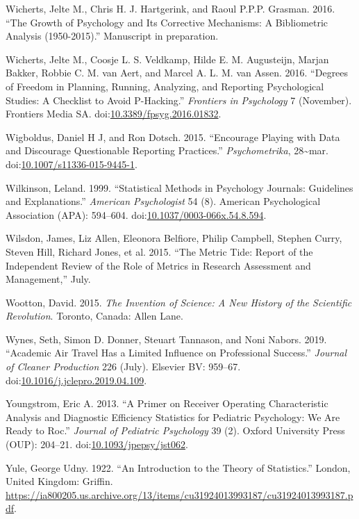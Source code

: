 \documentclass[a5paper]{book}
\begin{document}
\hypertarget{ref-wicherts2016}{}
Wicherts, Jelte M., Chris H. J. Hartgerink, and Raoul P.P.P. Grasman.
2016. ``The Growth of Psychology and Its Corrective Mechanisms: A
Bibliometric Analysis (1950-2015).'' Manuscript in preparation.

\hypertarget{ref-doi:10.3389ux2ffpsyg.2016.01832}{}
Wicherts, Jelte M., Coosje L. S. Veldkamp, Hilde E. M. Augusteijn,
Marjan Bakker, Robbie C. M. van Aert, and Marcel A. L. M. van Assen.
2016. ``Degrees of Freedom in Planning, Running, Analyzing, and
Reporting Psychological Studies: A Checklist to Avoid P-Hacking.''
\emph{Frontiers in Psychology} 7 (November). Frontiers Media SA.
doi:\href{https://doi.org/10.3389/fpsyg.2016.01832}{10.3389/fpsyg.2016.01832}.

\hypertarget{ref-doi:10.1007ux2fs11336-015-9445-1}{}
Wigboldus, Daniel H J, and Ron Dotsch. 2015. ``Encourage Playing with
Data and Discourage Questionable Reporting Practices.''
\emph{Psychometrika}, 28\textasciitilde{}mar.
doi:\href{https://doi.org/10.1007/s11336-015-9445-1}{10.1007/s11336-015-9445-1}.

\hypertarget{ref-doi:10.1037ux2f0003-066x.54.8.594}{}
Wilkinson, Leland. 1999. ``Statistical Methods in Psychology Journals:
Guidelines and Explanations.'' \emph{American Psychologist} 54 (8).
American Psychological Association (APA): 594--604.
doi:\href{https://doi.org/10.1037/0003-066x.54.8.594}{10.1037/0003-066x.54.8.594}.

\hypertarget{ref-doi:10.13140ux2fRG.2.1.4929.1363}{}
Wilsdon, James, Liz Allen, Eleonora Belfiore, Philip Campbell, Stephen
Curry, Steven Hill, Richard Jones, et al. 2015. ``The Metric Tide:
Report of the Independent Review of the Role of Metrics in Research
Assessment and Management,'' July.

\hypertarget{ref-isbn:9781846142109}{}
Wootton, David. 2015. \emph{The Invention of Science: A New History of
the Scientific Revolution}. Toronto, Canada: Allen Lane.

\hypertarget{ref-doi:10.1016ux2fj.jclepro.2019.04.109}{}
Wynes, Seth, Simon D. Donner, Steuart Tannason, and Noni Nabors. 2019.
``Academic Air Travel Has a Limited Influence on Professional Success.''
\emph{Journal of Cleaner Production} 226 (July). Elsevier BV: 959--67.
doi:\href{https://doi.org/10.1016/j.jclepro.2019.04.109}{10.1016/j.jclepro.2019.04.109}.

\hypertarget{ref-doi:10.1093ux2fjpepsyux2fjst062}{}
Youngstrom, Eric A. 2013. ``A Primer on Receiver Operating
Characteristic Analysis and Diagnostic Efficiency Statistics for
Pediatric Psychology: We Are Ready to Roc.'' \emph{Journal of Pediatric
Psychology} 39 (2). Oxford University Press (OUP): 204--21.
doi:\href{https://doi.org/10.1093/jpepsy/jst062}{10.1093/jpepsy/jst062}.

\hypertarget{ref-yule1922}{}
Yule, George Udny. 1922. ``An Introduction to the Theory of
Statistics.'' London, United Kingdom: Griffin.
\url{https://ia800205.us.archive.org/13/items/cu31924013993187/cu31924013993187.pdf}.
\end{document}
